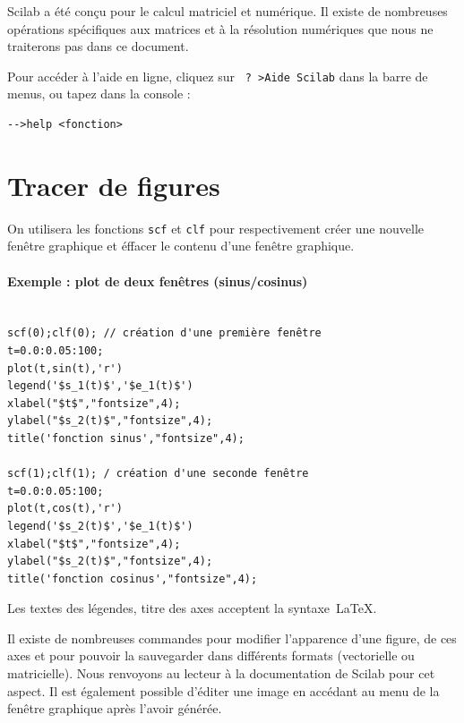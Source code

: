 Scilab a été conçu pour le calcul matriciel et numérique. 
Il existe de nombreuses opérations spécifiques aux matrices et à la résolution 
numériques que nous ne traiterons pas dans ce document.

Pour accéder à l'aide en ligne, cliquez sur \verb/ ? >Aide Scilab/ 
dans la barre de menus, ou tapez   dans la console :
\begin{code}
\begin{verbatim}
-->help <fonction>
\end{verbatim}
\end{code}

\section{Tracer de figures}
On utilisera les fonctions \verb?scf? et \verb?clf?  pour respectivement
créer une nouvelle fenêtre graphique et éffacer le contenu d'une fenêtre graphique.

\paragraph{Exemple : plot de deux fenêtres (sinus/cosinus)}
\begin{code}
\begin{verbatim}

scf(0);clf(0); // création d'une première fenêtre
t=0.0:0.05:100;
plot(t,sin(t),'r')
legend('$s_1(t)$','$e_1(t)$')
xlabel("$t$","fontsize",4);
ylabel("$s_2(t)$","fontsize",4);
title('fonction sinus',"fontsize",4);

scf(1);clf(1); / création d'une seconde fenêtre
t=0.0:0.05:100;
plot(t,cos(t),'r')
legend('$s_2(t)$','$e_1(t)$')
xlabel("$t$","fontsize",4);
ylabel("$s_2(t)$","fontsize",4);
title('fonction cosinus',"fontsize",4);
\end{verbatim}
\end{code}
          
Les textes des légendes, titre des axes acceptent la syntaxe~\LaTeX.

Il existe de nombreuses commandes pour modifier l'apparence
d'une figure, de ces axes et pour pouvoir la sauvegarder
dans différents formats (vectorielle ou matricielle).
Nous renvoyons au lecteur à la documentation de Scilab pour
cet aspect. Il est également possible d'éditer une image en accédant
au menu de la fenêtre graphique après l'avoir générée.


